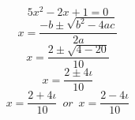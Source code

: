 \documentclass{article}
\begin{document}
	$$5x^2-2x+1=0$$
	$$x=\frac{-b\pm\sqrt{b^2-4ac}}{2a}$$
	$$x=\frac{2\pm\sqrt{4-20}}{10}$$
	$$x=\frac{2\pm4\iota}{10}$$
	$$x=\frac{2+4\iota}{10} \enspace or \enspace x=\frac{2-4\iota}{10}$$
\end{document}
